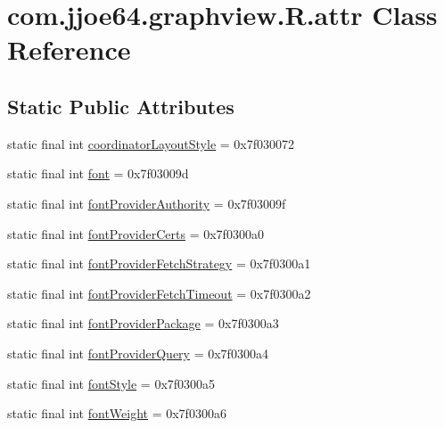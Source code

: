 \hypertarget{classcom_1_1jjoe64_1_1graphview_1_1_r_1_1attr}{}\section{com.\+jjoe64.\+graphview.\+R.\+attr Class Reference}
\label{classcom_1_1jjoe64_1_1graphview_1_1_r_1_1attr}
\subsection*{Static Public Attributes}
\begin{DoxyCompactItemize}
\item 
static final int \mbox{\hyperlink{classcom_1_1jjoe64_1_1graphview_1_1_r_1_1attr_a031268af1f64363f6fe3a91f44f0bd60}{coordinator\+Layout\+Style}} = 0x7f030072
\item 
static final int \mbox{\hyperlink{classcom_1_1jjoe64_1_1graphview_1_1_r_1_1attr_acbd46c432776700e8825b434f9b44fe5}{font}} = 0x7f03009d
\item 
static final int \mbox{\hyperlink{classcom_1_1jjoe64_1_1graphview_1_1_r_1_1attr_ad5b6fb3194045d3d53491208fe6c1072}{font\+Provider\+Authority}} = 0x7f03009f
\item 
static final int \mbox{\hyperlink{classcom_1_1jjoe64_1_1graphview_1_1_r_1_1attr_a5f7820786c1f7157e1e2fbaf5de346eb}{font\+Provider\+Certs}} = 0x7f0300a0
\item 
static final int \mbox{\hyperlink{classcom_1_1jjoe64_1_1graphview_1_1_r_1_1attr_a485cdb233b83d2300ff842f67f951f63}{font\+Provider\+Fetch\+Strategy}} = 0x7f0300a1
\item 
static final int \mbox{\hyperlink{classcom_1_1jjoe64_1_1graphview_1_1_r_1_1attr_ad442fde8548d8afdc1afa28948194934}{font\+Provider\+Fetch\+Timeout}} = 0x7f0300a2
\item 
static final int \mbox{\hyperlink{classcom_1_1jjoe64_1_1graphview_1_1_r_1_1attr_a2d8ff817e994d0cc9d194e51d49ccf2b}{font\+Provider\+Package}} = 0x7f0300a3
\item 
static final int \mbox{\hyperlink{classcom_1_1jjoe64_1_1graphview_1_1_r_1_1attr_a48607fec2eceb4e62d4ca8e242f6eeea}{font\+Provider\+Query}} = 0x7f0300a4
\item 
static final int \mbox{\hyperlink{classcom_1_1jjoe64_1_1graphview_1_1_r_1_1attr_ab80f38867473b73ac63e23f4b8b454fd}{font\+Style}} = 0x7f0300a5
\item 
static final int \mbox{\hyperlink{classcom_1_1jjoe64_1_1graphview_1_1_r_1_1attr_a9294ab1a7e8b0b4fb35e92fd6b18be08}{font\+Weight}} = 0x7f0300a6

\end{DoxyCompactItemize}
